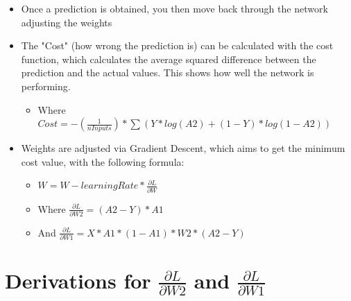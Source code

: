 \documentclass[10pt,a4paper]{article}
\begin{document}
\begin{itemize}
    \item Once a prediction is obtained, you then move back through the network adjusting the weights
    \item The "Cost" (how wrong the prediction is) can be calculated with the cost function, which calculates the average squared difference between the prediction and the actual values. This shows how well the network is performing.
    \begin{itemize}
        \item Where $Cost = -(\frac{1}{nInputs}) * \sum(Y * log(A2) + (1-Y) * log(1-A2))$
    \end{itemize}
    \item Weights are adjusted via Gradient Descent, which aims to get the minimum cost value, with the following formula:
    \begin{itemize}
        \item $W = W - learningRate * \frac{\partial{L}}{\partial{W}}$
        \item Where $\frac{\partial{L}}{\partial{W2}} = (A2-Y) * A1$
        \item And $\frac{\partial{L}}{\partial{W1}} = X * A1 * (1-A1) * W2 * (A2-Y)$
    \end{itemize}
\end{itemize}

\section{Derivations for $\frac{\partial{L}}{\partial{W2}}$ and $\frac{\partial{L}}{\partial{W1}}$}
\end{document}
